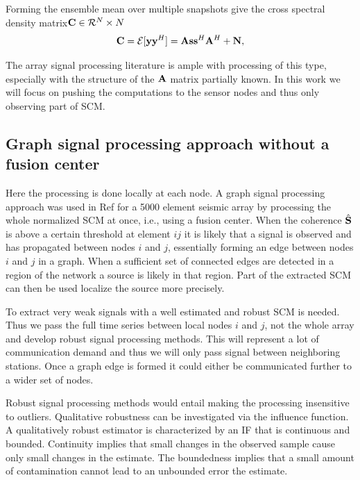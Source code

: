 \documentclass{article}
\begin{document}
Forming the ensemble mean over multiple snapshots give the cross spectral density matrix${\bf C}\in {\cal R}^N\times N$
\begin{equation}
{\bf C}={\cal E}[{\bf y} {\bf y}^H]= {\bf A}{\bf s}{\bf s}^H{\bf A}^H+{\bf N},
\end{equation}

The array signal processing literature is ample with processing of this type, especially with the structure of the $\bf A$ matrix partially known. In this work we will focus on pushing the computations to the sensor nodes and thus only observing part of SCM.

\subsection{Graph signal processing approach without a fusion center}
Here the processing is done locally at each node. A graph signal processing approach was used in Ref \cite{riahi2017} for a 5000 element seismic array by processing the whole normalized SCM at once, i.e., using a fusion center. 
When the coherence $\hat{\bf S}$ is above a certain threshold at  element $ij$ it is likely that a signal is observed and has propagated between nodes $i$ and $j$, essentially forming an edge between nodes  $i$ and $j$ in a graph. When a sufficient set of connected edges are detected in a region of the network a source is likely in that region. Part of the extracted SCM can then be used localize the source more precisely.

To extract very weak signals with a well estimated and robust SCM is needed. Thus we  pass the full time series between local nodes $i$ and $j$, not the whole array and develop robust signal processing methods\cite{zoubir2018}. This will represent a lot of communication demand and thus we will only pass signal between neighboring stations. Once a graph edge is formed it could either be communicated further to a wider set of nodes.

Robust signal processing methods\cite{zoubir2018} would entail making the processing insensitive to outliers. Qualitative robustness can be investigated via the influence function. A qualitatively robust estimator is characterized by an IF that is continuous and bounded. Continuity implies that small changes in the observed sample cause only small changes in the estimate. The boundedness implies that a small amount of contamination cannot lead to an unbounded error the estimate.
\end{document}

